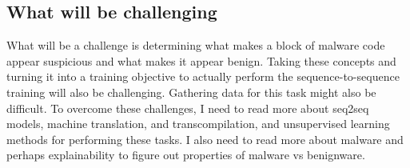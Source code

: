 \documentclass[conference]{IEEEtran}
\begin{document}
\subsection{What will be challenging}

What will be a challenge is determining what makes a block of malware code appear suspicious and what makes it appear benign. Taking these concepts and turning it into a training objective to actually perform the sequence-to-sequence training will also be challenging. Gathering data for this task might also be difficult. To overcome these challenges, I need to read more about seq2seq models, machine translation, and transcompilation, and unsupervised learning methods for performing these tasks. I also need to read more about malware and perhaps explainability to figure out properties of malware vs benignware.




\end{document}
